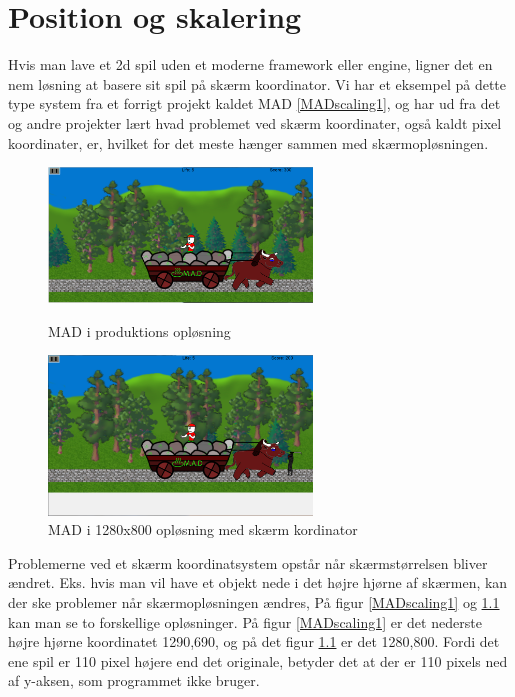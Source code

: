 \documentclass[Main.tex]{PositionOgSkalering}
\begin{document}
\chapter{Position og skalering}
Hvis man lave et  2d spil uden et moderne framework eller engine, ligner det en nem løsning at basere sit spil på skærm koordinator. Vi har et eksempel på dette type system fra et forrigt projekt kaldet MAD \ref{MADscaling1}, og har ud fra det og andre projekter lært hvad problemet ved skærm koordinater, også kaldt pixel koordinater, er, hvilket for det meste hænger sammen med skærmopløsningen.

\begin{figure}[h]
\centering
\parbox{7cm}{   
\includegraphics[width = 7cm]{billeder/MADscaling1}
\caption{MAD i produktions opløsning}    
\label{MADscaling1}}
\qquad
\begin{minipage}{7cm}
\includegraphics[width = 7cm]{billeder/MADscaling2}
\caption{MAD i 1280x800 opløsning med skærm kordinator}    
\label{MADscaling2}
\end{minipage}
\end{figure}

Problemerne ved et skærm koordinatsystem opstår når skærmstørrelsen bliver ændret. Eks. hvis man vil have et objekt nede i det højre hjørne af skærmen, kan der ske problemer når  skærmopløsningen ændres, På figur \ref{MADscaling1} og \ref{MADscaling2} kan man se to forskellige opløsninger. På figur \ref{MADscaling1} er det nederste højre hjørne koordinatet 1290,690, og på det figur \ref{MADscaling2} er det 1280,800. Fordi det ene spil er 110 pixel højere end det originale, betyder det at der er 110 pixels ned af y-aksen, som programmet ikke bruger.
\end{document}
